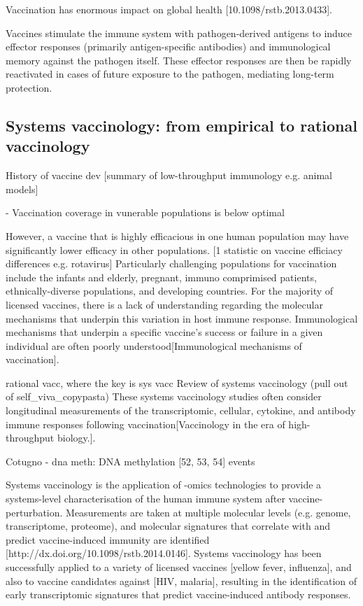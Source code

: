 Vaccination has enormous impact on global health [10.1098/rstb.2013.0433].

Vaccines stimulate the immune system with pathogen-derived antigens to induce effector responses (primarily antigen-specific antibodies) and immunological memory against the pathogen itself.
These effector responses are then be rapidly reactivated in cases of future exposure to the pathogen, mediating long-term protection.

\subsection{Systems vaccinology: from empirical to rational vaccinology}

History of vaccine dev
[summary of low-throughput immunology e.g. animal models]  

- Vaccination coverage in vunerable populations is below optimal

However, a vaccine that is highly efficacious in one human population may have significantly lower efficacy in other populations.
[1 statistic on vaccine efficiacy differences e.g. rotavirus]
Particularly challenging populations for vaccination include the infants and elderly, pregnant, immuno comprimised patients, ethnically-diverse populations, and developing countries.
For the majority of licensed vaccines, there is a lack of understanding regarding the molecular mechanisms that underpin this variation in host immune response.
Immunological mechanisms that underpin a specific vaccine's success or failure in a given individual are often poorly understood[Immunological mechanisms of vaccination]. 

rational vacc, where the key is sys vacc
Review of systems vaccinology (pull out of self\_viva\_copypasta)
These systems vaccinology studies often consider longitudinal measurements of the transcriptomic, cellular, cytokine, and antibody immune responses following vaccination[Vaccinology in the era of high-throughput biology.].

Cotugno
- dna meth: DNA methylation [52, 53, 54] events

Systems vaccinology is the application of -omics technologies to provide a systems-level characterisation of the human immune system after vaccine-perturbation.
Measurements are taken at multiple molecular levels (e.g. genome, transcriptome, proteome), and molecular signatures that correlate with and predict vaccine-induced immunity are identified [http://dx.doi.org/10.1098/rstb.2014.0146].
Systems vaccinology has been successfully applied to a variety of licensed vaccines [yellow fever, influenza], and also to vaccine candidates against [HIV, malaria], resulting in the identification of early transcriptomic signatures that predict vaccine-induced antibody responses.

